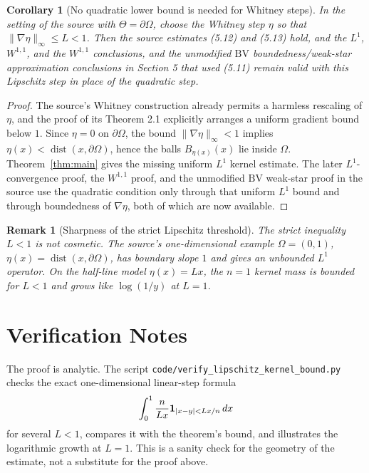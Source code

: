\documentclass[11pt]{article}
\newtheorem{corollary}{Corollary}
\newtheorem{remark}{Remark}
\newcommand{\dist}{\operatorname{dist}}
\begin{document}
\begin{corollary}[No quadratic lower bound is needed for Whitney steps]
\label{cor:whitney}
In the setting of the source with \(\Theta=\partial\Omega\), choose the
Whitney step \(\eta\) so that \(\|\nabla\eta\|_\infty\le L<1\).  Then the
source estimates (5.12) and (5.13) hold, and the \(L^1\), \(W^{1,1}\), and
the \(W^{1,1}\) conclusions, and the unmodified \(\mathrm{BV}\)
boundedness/weak-star approximation conclusions in Section 5 that used
(5.11) remain valid with this Lipschitz step in place of the quadratic step.
\end{corollary}

\begin{proof}
The source's Whitney construction already permits a harmless rescaling of
\(\eta\), and the proof of its Theorem 2.1 explicitly arranges a uniform
gradient bound below \(1\).  Since \(\eta=0\) on \(\partial\Omega\), the
bound \(\|\nabla\eta\|_\infty<1\) implies
\(\eta(x)<\dist(x,\partial\Omega)\), hence the balls \(B_{\eta(x)}(x)\) lie
inside \(\Omega\).  Theorem~\ref{thm:main} gives the missing uniform
\(L^1\) kernel estimate.  The later \(L^1\)-convergence proof, the
\(W^{1,1}\) proof, and the unmodified \(\mathrm{BV}\) weak-star proof in
the source use the quadratic condition only through that uniform \(L^1\)
bound and through boundedness of \(\nabla\eta\), both of which are now
available.
\end{proof}

\begin{remark}[Sharpness of the strict Lipschitz threshold]
The strict inequality \(L<1\) is not cosmetic.  The source's one-dimensional
example \(\Omega=(0,1)\), \(\eta(x)=\dist(x,\partial\Omega)\), has boundary
slope \(1\) and gives an unbounded \(L^1\) operator.  On the half-line model
\(\eta(x)=Lx\), the \(n=1\) kernel mass is bounded for \(L<1\) and grows like
\(\log(1/y)\) at \(L=1\).
\end{remark}

\section*{Verification Notes}

The proof is analytic.  The script
\texttt{code/verify\_lipschitz\_kernel\_bound.py} checks the exact
one-dimensional linear-step formula
\[
  \int_0^1 \frac{n}{Lx}{\bf 1}_{|x-y|<Lx/n}\,dx
\]
for several \(L<1\), compares it with the theorem's bound, and illustrates
the logarithmic growth at \(L=1\).  This is a sanity check for the geometry of
the estimate, not a substitute for the proof above.
\end{document}
